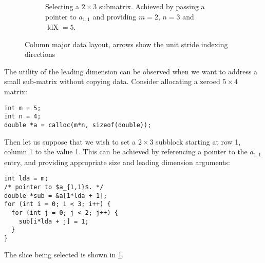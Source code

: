 \documentclass[a4paper]{article}
\begin{document}
\begin{figure}[htbp]
\begin{subfigure}[r]{0.475\textwidth}
    \caption{Selecting a $2 \times 3$ submatrix.  Achieved by passing
      a pointer to $a_{1,1}$ and providing $m = 2$, $n = 3$ and
      $\operatorname{ldX} = 5$.\label{fig:matrix-layout-slice}}
  \end{subfigure}
  \caption{Column major data layout, arrows show the unit stride indexing directions}
  \label{fig:matrix-layout}
\end{figure}
The utility of the leading dimension can be observed when we want to
address a small sub-matrix without copying data.  Consider allocating
a zeroed $5 \times 4$ matrix:
\begin{verbatim}
int m = 5;
int n = 4;
double *a = calloc(m*n, sizeof(double));
\end{verbatim}
Then let us suppose that we wish to set a $2 \times 3$ subblock
starting at row 1, column 1 to the value 1.  This can be achieved by
referencing a pointer to the $a_{1, 1}$ entry, and providing
appropriate size and leading dimension arguments:
\begin{verbatim}
int lda = m;
/* pointer to $a_{1,1}$. */
double *sub = &a[1*lda + 1];
for (int i = 0; i < 3; i++) {
  for (int j = 0; j < 2; j++) {
    sub[i*lda + j] = 1;
  }
}
\end{verbatim}
The slice being selected is shown in \cref{fig:matrix-layout-slice}.
\end{document}
